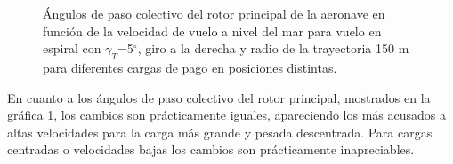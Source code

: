 \begin{figure}
	\centering
	\caption{Ángulos de paso colectivo del rotor principal de la aeronave en función de la velocidad de vuelo a nivel del mar para vuelo en espiral con $\gamma_T$=5$^\circ$, giro a la derecha y radio de la trayectoria 150 m para diferentes cargas de pago en posiciones distintas.}
	\label{Theta0VEMPL}
\end{figure}

En cuanto a los ángulos de paso colectivo del rotor principal, mostrados en la gráfica \ref{Theta0VEMPL}, los cambios son prácticamente iguales, apareciendo los más acusados a altas velocidades para la carga más grande y pesada descentrada. Para cargas centradas o velocidades bajas los cambios son prácticamente inapreciables.

